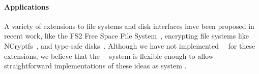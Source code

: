\paragraph{Applications}

A variety of extensions to file systems and disk interfaces have been proposed
in recent work, like the FS2 Free Space File System~\cite{huang05fs2},
encrypting file systems like NCryptfs~\cite{wright03ncryptfs}, and type-safe
disks~\cite{sivathanu06typesafe}. Although we have not implemented \Kudos\
\modules\ for these extensions, we believe that the \Kudos\ \module\ system is
flexible enough to allow straightforward implementations of these ideas as
system \modules.
